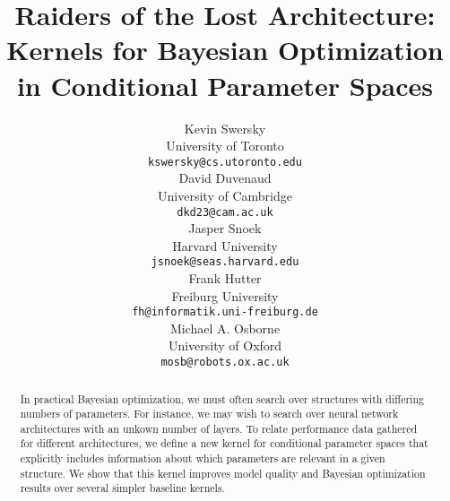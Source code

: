 \documentclass{article}
\newcommand{\note}[1]{}
\begin{document}
\title{Raiders of the Lost Architecture:\\Kernels for Bayesian Optimization in Conditional Parameter Spaces}

\author{
Kevin Swersky \\
University of Toronto \\
\texttt{kswersky@cs.utoronto.edu} \\
\And
David Duvenaud \\
University of Cambridge \\
\texttt{dkd23@cam.ac.uk} \\
\And
Jasper Snoek\\
Harvard University \\
\texttt{jsnoek@seas.harvard.edu} \\
\AND
Frank Hutter  \\
Freiburg University \\
{\tt fh@informatik.uni-freiburg.de} \\
\And
Michael A. Osborne \\
University of Oxford \\
{\tt mosb@robots.ox.ac.uk} \\
}




\maketitle
\begin{abstract}
In practical Bayesian optimization, we must often search over structures with differing numbers of parameters.  For instance, we may wish to search over neural network architectures with an unkown number of layers.  To relate performance data gathered for different architectures, we define a new kernel for conditional parameter spaces that explicitly includes information about which parameters are relevant in a given structure. We show that this kernel improves model quality and Bayesian optimization results over several simpler baseline kernels.
\end{abstract}


\end{document}
